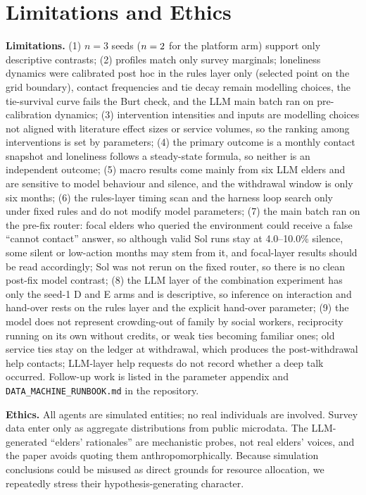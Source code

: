 \documentclass[10pt,twocolumn]{article}
\begin{document}
\section{Limitations and Ethics}\label{sec:limits}
\textbf{Limitations.} (1) $n=3$ seeds ($n=2$ for the platform arm) support only descriptive contrasts; (2) profiles match only survey marginals; loneliness dynamics were calibrated post hoc in the rules layer only (selected point on the grid boundary), contact frequencies and tie decay remain modelling choices, the tie-survival curve fails the Burt check, and the LLM main batch ran on pre-calibration dynamics; (3) intervention intensities and inputs are modelling choices not aligned with literature effect sizes or service volumes, so the ranking among interventions is set by parameters; (4) the primary outcome is a monthly contact snapshot and loneliness follows a steady-state formula, so neither is an independent outcome; (5) macro results come mainly from six LLM elders and are sensitive to model behaviour and silence, and the withdrawal window is only six months; (6) the rules-layer timing scan and the harness loop search only under fixed rules and do not modify model parameters; (7) the main batch ran on the pre-fix router: focal elders who queried the environment could receive a false ``cannot contact'' answer, so although valid Sol runs stay at 4.0--10.0\% silence, some silent or low-action months may stem from it, and focal-layer results should be read accordingly; Sol was not rerun on the fixed router, so there is no clean post-fix model contrast; (8) the LLM layer of the combination experiment has only the seed-1 D and E arms and is descriptive, so inference on interaction and hand-over rests on the rules layer and the explicit hand-over parameter; (9) the model does not represent crowding-out of family by social workers, reciprocity running on its own without credits, or weak ties becoming familiar ones; old service ties stay on the ledger at withdrawal, which produces the post-withdrawal help contacts; LLM-layer help requests do not record whether a deep talk occurred. Follow-up work is listed in the parameter appendix and \texttt{DATA\_MACHINE\_RUNBOOK.md} in the repository.

\textbf{Ethics.} All agents are simulated entities; no real individuals are involved. Survey data enter only as aggregate distributions from public microdata. The LLM-generated ``elders' rationales'' are mechanistic probes, not real elders' voices, and the paper avoids quoting them anthropomorphically. Because simulation conclusions could be misused as direct grounds for resource allocation, we repeatedly stress their hypothesis-generating character.
\end{document}
